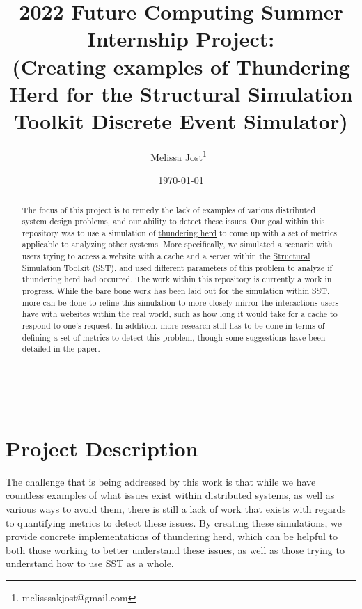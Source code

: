 \documentclass{article}
\begin{document}
        \title{2022 Future Computing Summer Internship Project:\\(Creating examples of Thundering Herd for the Structural Simulation Toolkit Discrete Event Simulator)}
        \author{Melissa Jost\thanks{melisssakjost@gmail.com}\ }
        \date{\today}
            \maketitle
        \begin{abstract}
            The focus of this project is to remedy the lack of examples of various distributed system
            design problems, and our ability to detect these issues.  Our goal within this repository was to use a simulation of \href{https://en.wikipedia.org/wiki/Thundering_herd_problem}{thundering herd} to come up with a set of metrics applicable to analyzing other systems.  More specifically, we simulated a scenario with users trying to access a website with a cache and a server within the \href{http://sst-simulator.org/}{Structural Simulation Toolkit (SST)}, and used different parameters of this problem to analyze if thundering herd had occurred.  The work within this repository is currently a work in progress.  While the bare bone work has been laid out for the simulation within SST, more can be done to refine this simulation to more closely mirror the interactions users have with websites within the real world, such as how long it would take for a cache to respond to one's request.  In addition, more research still has to be done in terms of defining a set of metrics to detect this problem, though some suggestions have been detailed in the paper.
        \end{abstract}

\ \\


\section{Project Description} %

The challenge that is being addressed by this work is that while we have countless examples of what issues exist within distributed systems, as well as various ways to avoid them, there is still a lack of work that exists with regards to quantifying metrics to detect these issues.  
By creating these simulations, we provide concrete implementations of thundering herd, which can be helpful to both those working to better understand these issues, as well as those trying to understand how to use SST as a whole. 
\end{document}
